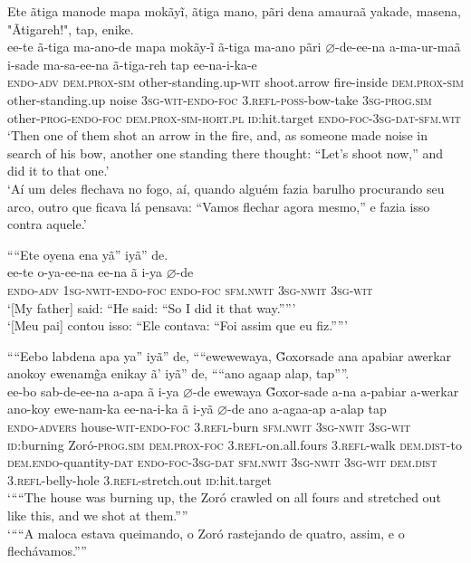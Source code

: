 \documentclass[output=paper,
modfonts,nonflat
]{langsci/langscibook}
\begin{document}
\ea Ete ãtiga manode mapa mokãyĩ, ãtiga mano, pãri dena amauraã yakade, masena, "Ãtigareh!", tap, enike.\\[.3em]
\gll ee-te ã-tiga ma-ano-de mapa mokãy-ĩ ã-tiga ma-ano pãri \(\varnothing\)-de-ee-na a-ma-ur-maã i-sade ma-sa-ee-na ã-tiga-reh tap ee-na-i-ka-e\\
\textsc{endo-adv} \textsc{dem.prox-sim} other-standing.up-\textsc{wit} shoot.arrow fire-inside \textsc{dem.prox-sim} other-standing.up noise \textsc{3sg-wit-endo-foc} \textsc{3.refl-poss}-bow-take \textsc{3sg-prog.sim} other-\textsc{prog-endo-foc} \textsc{dem.prox-sim-hort.pl} \textsc{id}:hit.target \textsc{endo-foc-3sg-dat-sfm.wit}\\
\glt ‘Then one of them shot an arrow in the fire, and, as someone made noise in search of his bow, another one standing there thought: “Let’s shoot now,” and did it to that one.’\\
\glt ‘Aí um deles flechava no fogo, aí, quando alguém fazia barulho procurando seu arco, outro que ficava lá pensava: “Vamos flechar agora mesmo,” e fazia isso contra aquele.’\\
\z

\ea ““Ete oyena ena yã” iyã” de.\\[.3em]
\gll ee-te o-ya-ee-na ee-na ã i-ya \(\varnothing\)-de\\
\textsc{endo-adv} \textsc{1sg-nwit-endo-foc} \textsc{endo-foc} \textsc{sfm.nwit} \textsc{3sg-nwit} \textsc{3sg-wit}\\
\glt ‘[My father] said: “He said: “So I did it that way.””’\\
\glt ‘[Meu pai] contou isso: “Ele contava: “Foi assim que eu fiz.””’\\
\z

\newpage
\ea ““Eebo labdena apa ya” iyã” de, ““ewewewaya, \~{G}oxorsade ana apabiar awerkar anokoy ewenam\~{g}a enikay ã’ iyã” de, ““ano agaap alap, tap””.\\[.3em]
\gll ee-bo sab-de-ee-na a-apa ã i-ya \(\varnothing\)-de ewewaya \~{G}oxor-sade a-na a-pabiar a-werkar ano-koy ewe-nam-ka ee-na-i-ka ã i-yã \(\varnothing\)-de ano a-agaa-ap a-alap tap\\
\textsc{endo-advers} house-\textsc{wit-endo-foc} \textsc{3.refl}-burn \textsc{sfm.nwit} \textsc{3sg-nwit} \textsc{3sg-wit} \textsc{id}:burning Zoró-\textsc{prog.sim} \textsc{dem.prox-foc} \textsc{3.refl}-on.all.fours \textsc{3.refl}-walk \textsc{dem.dist}-to \textsc{dem.endo}-quantity-\textsc{dat} \textsc{endo-foc-3sg-dat} \textsc{sfm.nwit} \textsc{3sg-nwit} \textsc{3sg-wit} \textsc{dem.dist} \textsc{3.refl}-belly-hole \textsc{3.refl}-stretch.out \textsc{id}:hit.target\\
\glt ‘““The house was burning up, the Zoró crawled on all fours and stretched out like this, and we shot at them.””{\footnotemark}\\
\glt ‘““A maloca estava queimando, o Zoró rastejando de quatro, assim, e o flechávamos.””
\z
\end{document}
